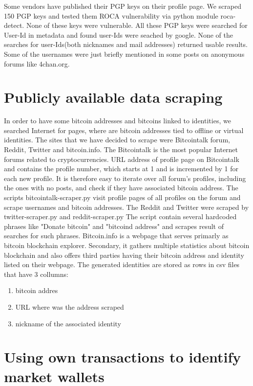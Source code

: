 \documentclass[
  digital, %
  table,   %
  lof,     %
  lot,     %
  oneside
]{fithesis3}
\begin{document}
Some vendors have published their PGP keys on their profile page.
We scraped 150 PGP keys and tested them ROCA vulnerability via python module roca-detect. None of these keys were vulnerable.
All these PGP keys were searched for User-Id in metadata and found user-Ids were seached by google.
None of the searches for user-Ids(both nicknames and mail addresses) returned usable results.
Some of the usernames were just briefly mentioned in some posts on anonymous forums like 4chan.org.

\section{Publicly available data scraping}
\label{Publicly available data scraping}

In order to have some bitcoin addresses and bitcoins linked to identities,
we searched Internet for pages, where are bitcoin addresses tied to offline or virtual identities.
The sites that we have decided to scrape were Bitcointalk forum, Reddit,
Twitter and bitcoin.info.
The Bitcointalk is the most popular Internet forums
related to cryptocurrencies. URL address of profile page on Bitcointalk
and contains the profile number, which starts at 1 and is incremented by 1
for each new profile. It is therefore easy to iterate over all forum's profiles,
including the ones with no posts, and check if they have associated bitcoin address.
The scripts bitcointalk-scraper.py visit profile pages of all profiles on the forum and scrape usernames and bitcoin addresses. 
The Reddit and Twitter were scraped by twitter-scraper.py and reddit-scraper.py
The script contain several hardcoded phrases like "Donate bitcoin" and "bitcoind address" and scrapes 
result of searches for such phrases.
Bitcoin.info is a webpage that serves primarly as bitcoin blockchain explorer. Secondary,
it gathers multiple statistics about bitcoin blockchain and also offers
third parties having their bitcoin address and identity listed on their webpage.
The generated identities are stored as rows in csv files that have 3 collumns:

\begin{enumerate}
 \item bitcoin addres
 \item URL where was the address scraped
 \item nickname of the associated identity
\end{enumerate}

\section{Using own transactions to identify market wallets}
\label{Using own transactions to identify market wallets}
\end{document}
